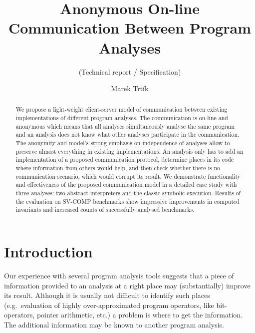 \documentclass[envcountsame]{llncs}
\begin{document}
\title{Anonymous On-line Communication Between Program Analyses}
\subtitle{(Technical report / Specification)}

\author{Marek Trt\'{i}k}
    

\maketitle

\begin{abstract}

We propose a light-weight client-server model of communication between existing
implementations of different program analyses. The communication is on-line and
anonymous which means that all analyses simultaneously analyse the same program
and an analysis does not know what other analyses participate in the
communication. The anonymity and model's strong emphasis on independence of
analyses allow to preserve almost everything in existing implementations. An
analysis only has to add an implementation of a proposed communication protocol,
determine places in its code where information from others would help, and then
check whether there is no communication scenario, which would corrupt its
result. We demonstrate functionality and effectiveness of the proposed
communication model in a detailed case study with three analyses: two abstract
interpreters and the classic symbolic execution. Results of the evaluation on
SV-COMP benchmarks show impressive improvements in computed invariants and
increased counts of successfully analysed benchmarks.

\end{abstract}

\section{Introduction}
\label{sec:Introduction}



Our experience with several program analysis tools suggests that a piece of
information provided to an analysis at a right place may (substantially) improve
its result. Although it is usually not difficult to identify such places
(e.g.~evaluation of highly over-approximated program operators, like
bit-operators, pointer arithmetic, etc.) a problem is where to get the
information. The additional information may be known to another program
analysis.
\end{document}
